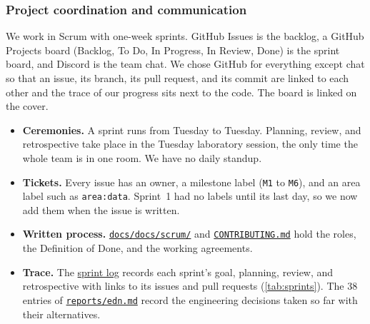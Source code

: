 \subsubsection{Project coordination and communication}
\label{sec:m1-coordination}

We work in Scrum with one-week sprints.
GitHub Issues is the backlog, a GitHub Projects board (Backlog, To Do, In Progress, In Review, Done) is the sprint board, and Discord is the team chat.
We chose GitHub for everything except chat so that an issue, its branch, its pull request, and its commit are linked to each other and the trace of our progress sits next to the code.
The board is linked on the cover.

\begin{itemize}
  \item \textbf{Ceremonies.} A sprint runs from Tuesday to Tuesday. Planning, review, and retrospective take place in the Tuesday laboratory session, the only time the whole team is in one room. We have no daily standup.
  \item \textbf{Tickets.} Every issue has an owner, a milestone label (\texttt{M1} to \texttt{M6}), and an area label such as \texttt{area:data}. Sprint~1 had no labels until its last day, so we now add them when the issue is written.
  \item \textbf{Written process.} \href{https://github.com/mlops-2627q1-mds-upc/MLOPS_Recommenditos/blob/main/docs/docs/scrum}{\texttt{docs/docs/scrum/}} and \href{https://github.com/mlops-2627q1-mds-upc/MLOPS_Recommenditos/blob/main/CONTRIBUTING.md}{\texttt{CONTRIBUTING.md}} hold the roles, the Definition of Done, and the working agreements.
  \item \textbf{Trace.} The \href{https://github.com/mlops-2627q1-mds-upc/MLOPS_Recommenditos/blob/main/docs/docs/scrum/sprints.md}{sprint log} records each sprint's goal, planning, review, and retrospective with links to its issues and pull requests (\cref{tab:sprints}). The 38 entries of \href{https://github.com/mlops-2627q1-mds-upc/MLOPS_Recommenditos/blob/main/reports/edn.md}{\texttt{reports/edn.md}} record the engineering decisions taken so far with their alternatives.
\end{itemize}

